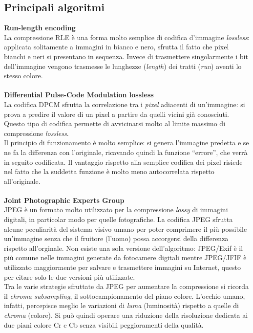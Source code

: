 \subsection{Principali algoritmi}
  \textbf{Run-length encoding} \\
  La compressione RLE è una forma molto semplice di codifica d'immagine 
  \emph{lossless}: applicata solitamente a immagini in bianco e nero, sfrutta 
  il fatto che pixel bianchi e neri si presentano in sequenza. Invece di 
  trasmettere singolarmente i bit dell'immagine vengono trasmesse le lunghezze 
  (\emph{length}) dei tratti (\emph{run}) aventi lo stesso colore.
  \\ \\
  \textbf{Differential Pulse-Code Modulation lossless} \\
  La codifica DPCM sfrutta la correlazione tra i \emph{pixel} adiacenti di 
  un'immagine: si prova a predire il valore di un pixel a partire da quelli 
  vicini già conosciuti. Questo tipo di codifica permette di avvicinarsi molto 
  al limite massimo di compressione \emph{lossless}.\\
  Il principio di funzionamento è molto semplice: si genera l'immagine predetta 
  e se ne fa la differenza con l'originale, ricavando quindi la funzione 
  ``errore'', che verrà in seguito codificata. Il vantaggio rispetto alla 
  semplice codifica dei pixel risiede nel fatto che la suddetta funzione è molto
  meno autocorrelata rispetto all'originale.
  \\ \\
  \textbf{Joint Photographic Experts Group} \\
  JPEG è un formato molto utilizzato per la compressione \emph{lossy} di 
  immagini digitali, in particolar modo per quelle fotografiche. La codifica 
  JPEG sfrutta alcune peculiarità del sistema visivo umano per poter comprimere 
  il più possibile un'immagine senza che il fruitore (l'uomo) possa accorgersi 
  della differenza rispetto all'orginale. Non esiste una sola versione 
  dell'algoritmo: JPEG/Exif è il più comune nelle immagini generate da 
  fotocamere digitali mentre JPEG/JFIF è utilizzato maggiormente per salvare e 
  trasmettere immagini su Internet, questo per citare solo le due versioni più 
  utilizzate. \\
  Tra le varie strategie sfruttate da JPEG per aumentare la compressione si 
  ricorda il \textit{chroma subsampling}, il sottocampionamento del piano 
  colore. L'occhio umano, infatti, percepisce meglio le variazioni di 
  \textit{luma} (luminosità) rispetto a quelle di \textit{chroma} (colore).
  Si può quindi operare una riduzione della risoluzione dedicata ai due piani 
  colore Cr e Cb senza visibili peggioramenti della qualità.


